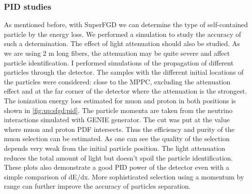 \documentclass[main.tex]{subfiles}
\begin{document}
\subsubsection{PID studies}
As mentioned before, with SuperFGD we can determine the type of self-contained particle by the energy loss. We performed a simulation to study the accuracy of such a determination. The effect of light attenuation should also be studied. As we are using 2 m long fibers, the attenuation may be quite severe and affect particle identification. I performed simulations of the propagation of different particles through the detector. The samples with the different initial locations of the particles were considered: close to the MPPC, excluding the attenuation effect and at the far corner of the detector where the attenuation is the strongest. The ionization energy loss estimated for muon and proton in both positions is shown in \autoref{fig:up:sfgd:pid}. The particle momenta are taken from the neutrino interactions simulated with GENIE generator. The cut was put at the value where muon and proton PDF intersects. Thus the efficiency and purity of the muon selection can be estimated. As one can see the quality of the selection depends very weak from the initial particle position. The light attenuation reduces the total amount of light but doesn't spoil the particle identification. These plots also demonstrate a good PID power of the detector even with a simple comparison of dE/dx. More sophisticated selection using a momentum by range can further improve the accuracy of particles separation.
\end{document}
